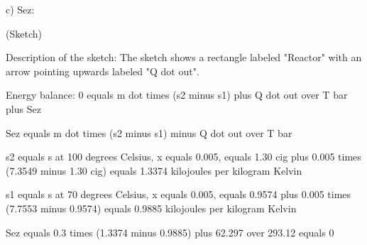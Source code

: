 c) Sez:

(Sketch)

Description of the sketch: The sketch shows a rectangle labeled "Reactor" with an arrow pointing upwards labeled "Q dot out".

Energy balance: 0 equals m dot times (s2 minus s1) plus Q dot out over T bar plus Sez

Sez equals m dot times (s2 minus s1) minus Q dot out over T bar

s2 equals s at 100 degrees Celsius, x equals 0.005, equals 1.30 cig plus 0.005 times (7.3549 minus 1.30 cig) equals 1.3374 kilojoules per kilogram Kelvin

s1 equals s at 70 degrees Celsius, x equals 0.005, equals 0.9574 plus 0.005 times (7.7553 minus 0.9574) equals 0.9885 kilojoules per kilogram Kelvin

Sez equals 0.3 times (1.3374 minus 0.9885) plus 62.297 over 293.12 equals 0